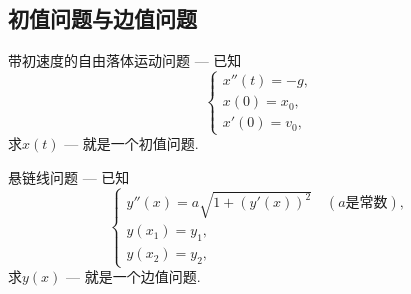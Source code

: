 \subsection{初值问题与边值问题}
\begin{example}
带初速度的自由落体运动问题
--- 已知\begin{equation*}
	\begin{cases}
		x''(t) = -g, \\
		x(0) = x_0, \\
		x'(0) = v_0,
	\end{cases}
\end{equation*}
求\(x(t)\)
--- 就是一个初值问题.
\end{example}


\begin{example}
悬链线问题
--- 已知\begin{equation*}
	\begin{cases}
		y''(x) = a \sqrt{1 + (y'(x))^2}
		\quad(\text{$a$是常数}), \\
		y(x_1) = y_1, \\
		y(x_2) = y_2,
	\end{cases}
\end{equation*}
求\(y(x)\)
--- 就是一个边值问题.
\end{example}


